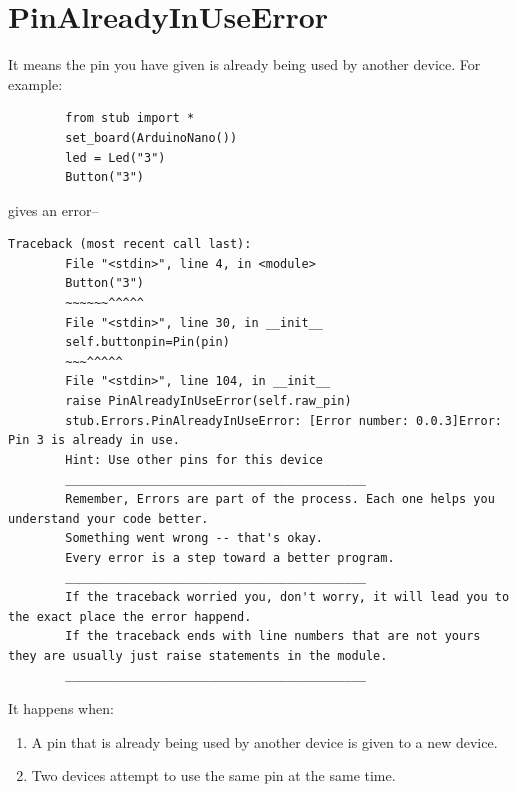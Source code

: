 	\section{PinAlreadyInUseError} 
	It means the pin you have given is already being used by another device. For example: 
	\begin{lstlisting} 
		from stub import * 
		set_board(ArduinoNano()) 
		led = Led("3") 
		Button("3") 
	\end{lstlisting} 
	gives an error-- 
	\begin{lstlisting}[style=tracebacks] 
		Traceback (most recent call last): 
		File "<stdin>", line 4, in <module> 
		Button("3") 
		~~~~~~^^^^^ 
		File "<stdin>", line 30, in __init__ 
		self.buttonpin=Pin(pin) 
		~~~^^^^^ 
		File "<stdin>", line 104, in __init__ 
		raise PinAlreadyInUseError(self.raw_pin) 
		stub.Errors.PinAlreadyInUseError: [Error number: 0.0.3]Error: Pin 3 is already in use. 
		Hint: Use other pins for this device 
		__________________________________________ 
		Remember, Errors are part of the process. Each one helps you understand your code better. 
		Something went wrong -- that's okay. 
		Every error is a step toward a better program. 
		__________________________________________ 
		If the traceback worried you, don't worry, it will lead you to the exact place the error happend. 
		If the traceback ends with line numbers that are not yours they are usually just raise statements in the module. 
		__________________________________________ 
	\end{lstlisting} 
	
	It happens when: 
	\begin{enumerate} 
		\item A pin that is already being used by another device is given to a new device. 
		\item Two devices attempt to use the same pin at the same time. 
	\end{enumerate} 
	\newpage 
	
